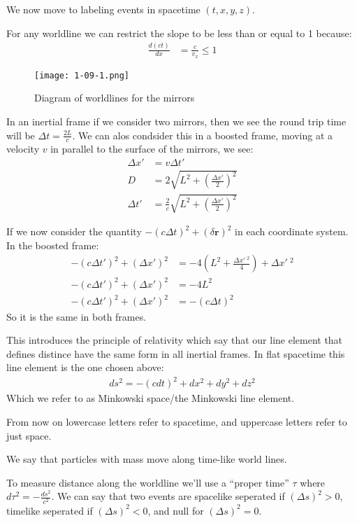 We now move to labeling events in spacetime $(t,x,y,z)$.

For any worldline we can restrict the slope to be less than or equal to 1 because:
\begin{align*}
	\frac{d (ct)}{dx} &= \frac{c}{v_x} \leq 1
\end{align*}

\begin{figure*}[h]
	\centering
	\texttt{[image: 1-09-1.png]}
	\caption*{Diagram of worldlines for the mirrors}
\end{figure*}
In an inertial frame if we consider two mirrors, then we see the round trip time will be $\Delta t = \frac{2L}{c}$. We can alos condsider this in a boosted frame, moving at a velocity $v$ in parallel to the surface of the mirrors, we see:
\begin{align*}
	\Delta x' &= v \Delta t' \\
	D &= 2\sqrt{L^2 + \left(\frac{\Delta x'}{2}\right)^2} \\
	\Delta t' &= \frac{2}{c}\sqrt{L^2 + \left(\frac{\Delta x'}{2}\right)^2}
\end{align*}

If we now consider the quantity $-(c\Delta t)^2 + (\delta \bm{r})^2$ in each coordinate system. In the boosted frame:
\begin{align*}
	-(c\Delta t')^2 + (\Delta x')^2 &= -4 (L^2 + \frac{\Delta x'\ ^2}{4}) + \Delta x'\ ^2 \\
	-(c\Delta t')^2 + (\Delta x')^2 &= -4 L^2 \\
	-(c\Delta t')^2 + (\Delta x')^2 &= -(c\Delta t)^2
\end{align*}
So it is the same in both frames.

This introduces the principle of relativity which say that our line element that defines distince have the same form in all inertial frames. In flat spacetime this line element is the one chosen above:
\begin{align*}
	ds^2 = -(c dt)^2 + dx^2 + dy^2 + dz^2
\end{align*}
Which we refer to as Minkowski space/the Minkowski line element.

From now on lowercase letters refer to spacetime, and uppercase letters refer to just space.

We say that particles with mass move along time-like world lines.

To measure distance along the worldline we'll use a ``proper time'' $\tau$ where $d\tau^2 = -\frac{ds^2}{c^2}$. We can say that two events are spacelike seperated if $(\Delta s)^2 >0$, timelike seperated if $(\Delta s)^2 <0$, and null for $(\Delta s)^2 =0$.

